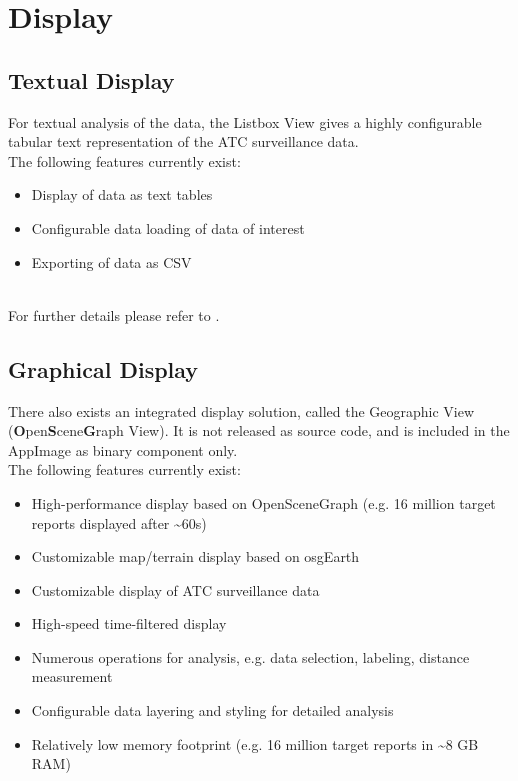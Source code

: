 \section{Display}

\subsection{Textual Display}

For textual analysis of the data, the Listbox View gives a highly configurable tabular text representation of the ATC surveillance data. \\

The following features currently exist:

\begin{itemize}  
\item Display of data as text tables
\item Configurable data loading of data of interest
\item Exporting of data as CSV
\end{itemize} 
\ \\

For further details please refer to .

\subsection{Graphical Display}
There also exists an integrated display solution, called the Geographic View (\textbf{O}pen\textbf{S}cene\textbf{G}raph View). It is not released as source code, and is included in the AppImage as binary component only. \\

The following features currently exist:

\begin{itemize}  
\item High-performance display based on OpenSceneGraph (e.g. 16 million target reports displayed after \textasciitilde60s)
\item Customizable map/terrain display based on osgEarth
\item Customizable display of ATC surveillance data
\item High-speed time-filtered display
\item Numerous operations for analysis, e.g. data selection, labeling, distance measurement
\item Configurable data layering and styling for detailed analysis
\item Relatively low memory footprint (e.g. 16 million target reports in \textasciitilde8 GB RAM)
\end{itemize} 
\ \\

